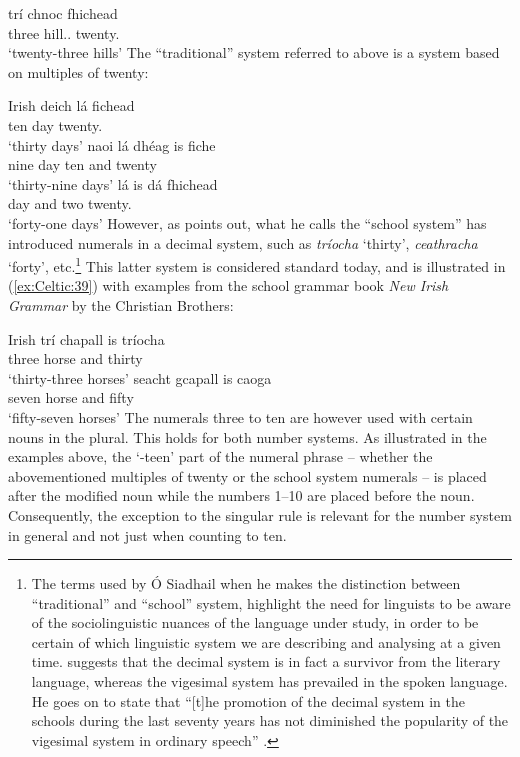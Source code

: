 \documentclass[output=paper,colorlinks,citecolor=brown]{langscibook}
\begin{document}
\ex
\gll trí  chnoc  fhichead\\
three {hill.\M.\SG} twenty.\GEN\\
\glt`twenty-three hills' \citep[101]{OSiadhail1982}
\z\z{}
The ``traditional'' system referred to above is a system based on multiples of twenty:

\ea\label{ex:Celtic:38} Irish
\ea
\gll deich lá fichead\\
ten  day twenty.\GEN\\
\glt`thirty days' \citep[101]{OSiadhail1982}
\ex
\gll naoi lá dh\'eag is fiche\\
nine day ten and twenty\\
\glt`thirty-nine days' \citep[101]{OSiadhail1982}
\ex
\gll lá is dá fhichead\\
day and two twenty.\GEN\\
\glt`forty-one days' \citep[102]{OSiadhail1982}
\z\z
However, as \citet[101]{OSiadhail1982} points out, what he calls the ``school system'' has introduced numerals in a decimal system, such as \emph{tríocha} `thirty', \emph{ceathracha} `forty', etc.\footnote{The terms used by \'O Siadhail when he makes the distinction between ``traditional'' and ``school'' system, highlight the need for linguists to be aware of the sociolinguistic nuances of the language under study, in order to be certain of which linguistic system we are describing and analysing at a given time. \citet[118--119]{MacEoin2002} suggests that the decimal system is in fact a survivor from the literary language, whereas the vigesimal system has prevailed in the spoken language. He goes on to state that ``[t]he promotion of the decimal system in the schools during the last seventy years has not diminished the popularity of the vigesimal system in ordinary speech'' \citep[119]{MacEoin2002}.} This latter system is considered standard today, and is illustrated in (\ref{ex:Celtic:39}) with examples from the school grammar book \emph{New Irish Grammar} by the Christian Brothers:

\ea\label{ex:Celtic:39} Irish \citep[76]{Brothers2002}
\ea
\gll trí  chapall is tríocha\\
three horse and thirty\\
\glt`thirty-three horses'
\ex
\gll seacht gcapall is caoga\\
seven horse and fifty\\
\glt`fifty-seven horses'
\z\z
The numerals three to ten are however used with certain nouns in the plural. This holds for both number systems. As illustrated in the examples above, the `-teen' part of the numeral phrase -- whether the abovementioned multiples of twenty or the school system numerals -- is placed after the modified noun while the numbers 1--10 are placed before the noun. Consequently, the exception to the singular rule is relevant for the number system in general and not just when counting to ten.
\end{document}

